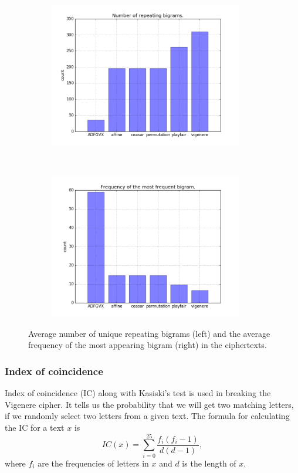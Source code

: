 \documentclass[a4paper]{article}
\begin{document}
\begin{figure}[H]
    \centering
    \begin{subfigure}[h]{0.5\textwidth}
    		\centering
        \includegraphics[height=2.5in]{img/bigrams_1.png}
    \end{subfigure}%
    ~
    \begin{subfigure}[h]{0.5\textwidth}
	    \centering
        \includegraphics[height=2.5in]{img/bigrams_2.png}
    \end{subfigure}
    \caption{Average number of unique repeating bigrams (left) and the average frequency of the most appearing bigram (right) in the ciphertexts.}
    \label{fig:bigrams}
\end{figure}

\subsubsection*{Index of coincidence}
Index of coincidence (IC) along with Kasiski's test is used in breaking the Vigenere cipher. It tells us the probability that we will get two matching letters, if we randomly select two letters from a given text. The formula for calculating the IC for a text $x$ is
$$IC(x) = \sum_{i=0}^{25} \frac{f_{i}(f_{i}-1)}{d(d-1)}, $$
where $f_{i}$ are the frequencies of letters in $x$ and $d$ is the length of $x$.
\end{document}
